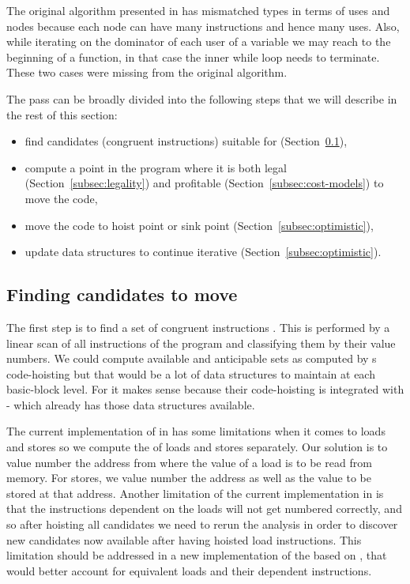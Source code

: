 \documentclass[sigplan,10pt,review,anonymous]{acmart}\settopmatter{printfolios=true,printccs=false,printacmref=false}
\begin{document}
The original algorithm presented in \cite{das2012} has mismatched types in terms
of uses and nodes because each node can have many instructions and hence many
uses. Also, while iterating on the dominator of each user of a variable we may
reach to the beginning of a function, in that case the inner while loop needs to
terminate. These two cases were missing from the original algorithm.

The \GCM{} pass can be broadly divided into the following steps that we will
describe in the rest of this section:
\begin{itemize}[leftmargin=*,topsep=0pt]
\item find candidates (congruent instructions) suitable for \gcm{}
  (Section~\ref{subsec:finding-candidates}),
\item compute a point in the program where it is both legal
  (Section~\ref{subsec:legality}) and profitable
  (Section~\ref{subsec:cost-models}) to move the code,
\item move the code to hoist point or sink point
  (Section~\ref{subsec:optimistic}),
\item update data structures to continue iterative \gcm{} (Section~\ref{subsec:optimistic}).
\end{itemize}

\subsection{Finding candidates to move}
\label{subsec:finding-candidates}
The first step is to find a set of congruent instructions
\cite{briggs1997}. This is performed by a linear scan of all instructions of the
program and classifying them by their value numbers. We could compute available
and anticipable sets as computed by s code-hoisting but that would be a lot
of data structures to maintain at each basic-block level. For \GCC{} it makes sense
because their code-hoisting is integrated with \GVN{}-\PRE{} which already has those
data structures available.

The current implementation of \GVN{} in \LLVM{} has some limitations when it
comes to loads and stores so we compute the \GVN{} of loads and stores
separately.  Our solution is to value number the address from where the value of
a load is to be read from memory. For stores, we value number the address as
well as the value to be stored at that address. Another limitation of the
current \GVN{} implementation in \LLVM{} is that the instructions dependent on
the loads will not get numbered correctly, and so after hoisting all candidates
we need to rerun the \GVN{} analysis in order to discover new candidates now
available after having hoisted load instructions.  This limitation should be
addressed in a new implementation of the \GVN{} based on \MemorySSA{}, that
would better account for equivalent loads and their dependent instructions.
\end{document}
